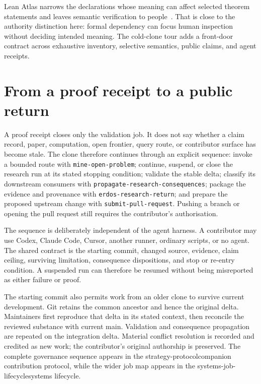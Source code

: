 \documentclass[11pt]{article}
\begin{document}
Lean Atlas narrows the declarations whose meaning can affect selected theorem
statements and leaves semantic verification to people~\cite{leanatlas}. That
is close to the authority distinction here: formal dependency can focus human
inspection without deciding intended meaning. The cold-clone tour adds a
front-door contract across exhaustive inventory, selective semantics, public
claims, and agent receipts.

\section{From a proof receipt to a public return}\label{sec:return}

A proof receipt closes only the validation job. It does not say whether a
claim record, paper, computation, open frontier, query route, or contributor
surface has become stale. The clone therefore continues through an explicit
sequence: invoke a bounded route with \texttt{mine-open-problem}; continue,
suspend, or close the research run at its stated stopping condition; validate
the stable delta; classify its downstream consumers with
\texttt{propagate-research-consequences}; package the evidence and provenance
with \texttt{erdos-research-return}; and prepare the proposed upstream change
with \texttt{submit-pull-request}. Pushing a branch or opening the pull request
still requires the contributor's authorisation.

The sequence is deliberately independent of the agent harness. A contributor
may use Codex, Claude Code, Cursor, another runner, ordinary scripts, or no
agent. The shared contract is the starting commit, changed source, evidence,
claim ceiling, surviving limitation, consequence dispositions, and stop or
re-entry condition. A suspended run can therefore be resumed without being
misreported as either failure or proof.

The starting commit also permits work from an older clone to survive current
development. Git retains the common ancestor and hence the original delta.
Maintainers first reproduce that delta in its stated context, then reconcile
the reviewed substance with current main. Validation and consequence
propagation are repeated on the integration delta. Material conflict
resolution is recorded and credited as new work; the contributor's original
authorship is preserved. The complete governance sequence appears in the
%
{strategy-protocol}{companion contribution protocol}, while the wider job map
appears in the
%
{systems-job-lifecycle}{systems lifecycle}.
\end{document}
